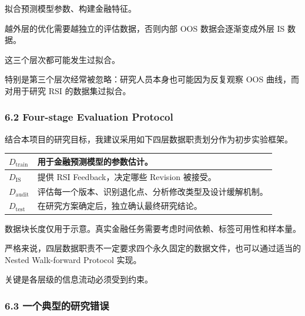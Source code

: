 拟合预测模型参数、构建金融特征。

越外层的优化需要越独立的评估数据，否则内部 OOS 数据会逐渐变成外层 IS 数据。

这三个层次都可能发生过拟合。

特别是第三个层次经常被忽略：研究人员本身也可能因为反复观察 OOS 曲线，而对用于研究 RSI 的数据集过拟合。

\hypertarget{part-2-27-0001-four-stage-evaluation-protocol}{%
\subsubsection{6.2 Four-stage Evaluation Protocol}\label{part-2-27-0001-four-stage-evaluation-protocol}}

结合本项目的研究目标，我建议采用如下四层数据职责划分作为初步实验框架。


\begin{readertable}
\begin{longtable}[]{@{}
  >{\raggedright\arraybackslash}p{}
  >{\raggedright\arraybackslash}p{}@{}}
\toprule
\(D_{\mathrm{train}}\) & 用于金融预测模型的参数估计。 \\
\midrule
\endhead
\(D_{\mathrm{IS}}\) & 提供 RSI Feedback，决定哪些 Revision 被接受。 \\
\(D_{\mathrm{audit}}\) & 评估每一个版本、识别退化点、分析修改类型及设计缓解机制。 \\
\(D_{\mathrm{test}}\) & 在研究方案确定后，独立确认最终研究结论。 \\
\bottomrule
\end{longtable}
\end{readertable}

数据块长度仅用于示意。真实金融任务需要考虑时间依赖、标签可用性和样本量。

严格来说，四层数据职责不一定要求四个永久固定的数据文件，也可以通过适当的 Nested Walk-forward Protocol 实现。

关键是各层级的信息流动必须受到约束。

\hypertarget{part-2-27-0001-ux4e00ux4e2aux5178ux578bux7684ux7814ux7a76ux9519ux8bef}{%
\subsubsection{6.3 一个典型的研究错误}\label{part-2-27-0001-ux4e00ux4e2aux5178ux578bux7684ux7814ux7a76ux9519ux8bef}}


